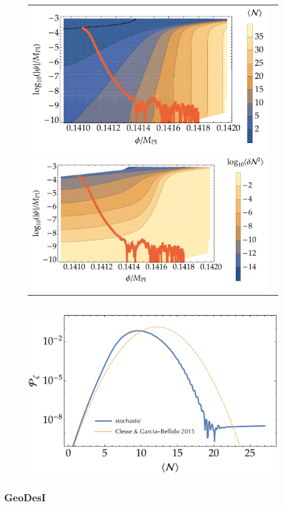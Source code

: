 \documentclass[aps, prd
, preprint
, nofootinbib 
, longbibliography
]{revtex4-1}
\begin{document}
\begin{figure}
	\centering
	\begin{tabular}{cc}
		\begin{minipage}{0.5\hsize}
			\centering
			\includegraphics[width=0.9\hsize]{figs/hybrid/N_conf.pdf}
		\end{minipage}
		\begin{minipage}{0.5\hsize}
			\centering
			\includegraphics[width=0.9\hsize]{figs/hybrid/dN2_conf.pdf}
		\end{minipage}
	\end{tabular} \\[10pt]
	\includegraphics[width=0.5\hsize]{figs/hybrid/Pzeta_conf.pdf}
	\caption{}
	\label{figs: hybrid_conf}
\end{figure}


\subsubsection{GeoDesI}


















\end{document}
